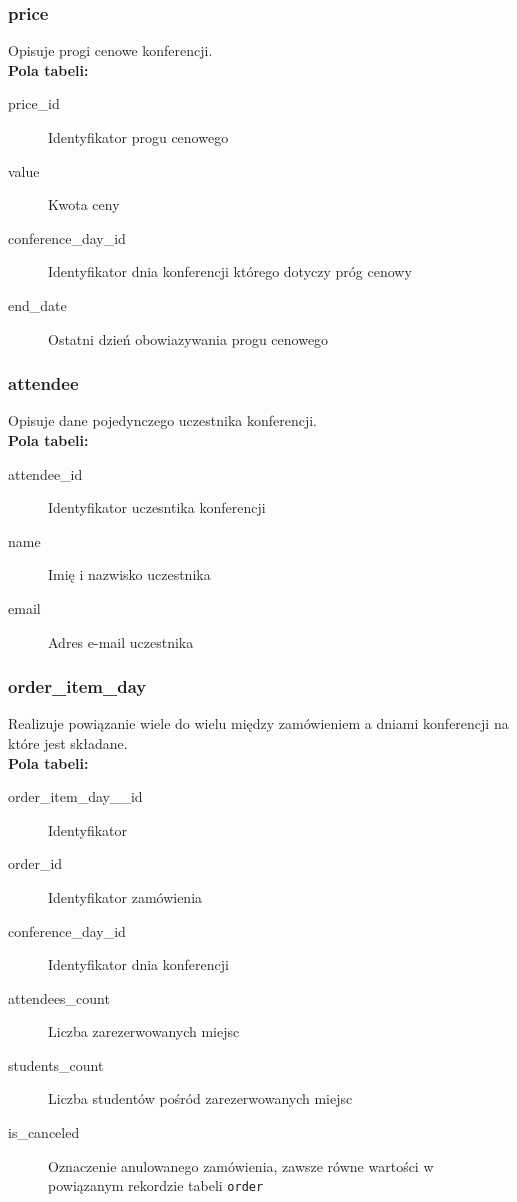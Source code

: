 \documentclass[12pt]{article}
\begin{document}
\subsubsection{price}
Opisuje progi cenowe konferencji. \\

\textbf{Pola tabeli:}
\begin{description}
\item [price\_id] Identyfikator progu cenowego
\item [value] Kwota ceny
\item [conference\_day\_id] Identyfikator dnia konferencji którego dotyczy próg cenowy
\item [end\_date] Ostatni dzień obowiazywania progu cenowego
\end{description}



\subsubsection{attendee}
Opisuje dane pojedynczego uczestnika konferencji.\\

\textbf{Pola tabeli:}
\begin{description}
\item [attendee\_id] Identyfikator uczesntika konferencji
\item [name] Imię i nazwisko uczestnika
\item [email] Adres e-mail uczestnika
\end{description}


\subsubsection{order\_item\_day}
Realizuje powiązanie wiele do wielu między zamówieniem a dniami konferencji na które jest składane. \\

\textbf{Pola tabeli:}
\begin{description}
\item [order\_item\_day\_\_id] Identyfikator
\item [order\_id] Identyfikator zamówienia
\item [conference\_day\_id] Identyfikator dnia konferencji
\item [attendees\_count] Liczba zarezerwowanych miejsc
\item [students\_count] Liczba studentów pośród zarezerwowanych miejsc
\item [is\_canceled] Oznaczenie anulowanego zamówienia, zawsze równe wartości w powiązanym rekordzie tabeli \texttt{order}
\end{description}
\end{document}
